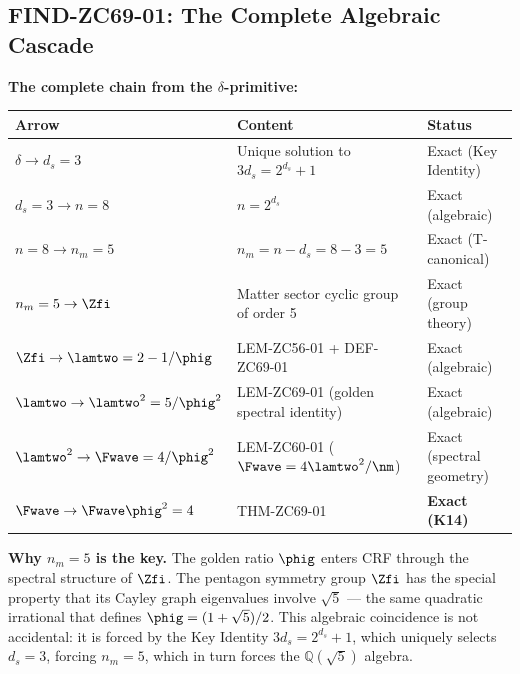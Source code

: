 \documentclass[12pt, a4paper]{article}
\begin{document}
\subsection{FIND-ZC69-01: The Complete Algebraic Cascade}
\label{sec:find01}

\begin{giftbox}[title={FIND-ZC69-01: Algebraic Cascade ---
  $\delta \to d_s=3 \to n_m=5 \to \Fwave\phig^2=4$ (Gift)}]

\textbf{The complete chain from the $\delta$-primitive:}

\medskip
\begin{center}
{\small\renewcommand{\arraystretch}{1.50}
\begin{tabular}{@{}l p{5.6cm} l@{}}
\toprule
Arrow & Content & Status \\
\midrule
$\delta \to d_s = 3$ &
  Unique solution to $3d_s = 2^{d_s}+1$ &
  Exact (Key Identity) \\[3pt]
$d_s = 3 \to n = 8$ &
  $n = 2^{d_s}$ &
  Exact (algebraic) \\[3pt]
$n = 8 \to n_m = 5$ &
  $n_m = n - d_s = 8 - 3 = 5$ &
  Exact (T-canonical) \\[3pt]
$n_m = 5 \to \Zfi$ &
  Matter sector cyclic group of order 5 &
  Exact (group theory) \\[3pt]
$\Zfi \to \lamtwo = 2-1/\phig$ &
  LEM-ZC56-01 + DEF-ZC69-01 &
  Exact (algebraic) \\[3pt]
$\lamtwo \to \lamtwo^2 = 5/\phig^2$ &
  LEM-ZC69-01 (golden spectral identity) &
  Exact (algebraic) \\[3pt]
$\lamtwo^2 \to \Fwave = 4/\phig^2$ &
  LEM-ZC60-01 ($\Fwave = 4\lamtwo^2/\nm$) &
  Exact (spectral geometry) \\[3pt]
$\Fwave \to \Fwave\phig^2 = 4$ &
  THM-ZC69-01 &
  \textbf{Exact (K14)} \\
\bottomrule
\end{tabular}
}
\end{center}

\medskip
\textbf{Why $n_m = 5$ is the key.}
The golden ratio $\phig$ enters CRF through the
spectral structure of $\Zfi$.
The pentagon symmetry group $\Zfi$ has the
special property that its Cayley graph eigenvalues
involve $\sqrt{5}$ — the same quadratic irrational
that defines $\phig = (1+\sqrt{5})/2$.
This algebraic coincidence is not accidental:
it is forced by the Key Identity $3d_s = 2^{d_s}+1$,
which uniquely selects $d_s = 3$, forcing $n_m = 5$,
which in turn forces the $\mathbb{Q}(\sqrt{5})$ algebra.


\end{giftbox}
\end{document}
